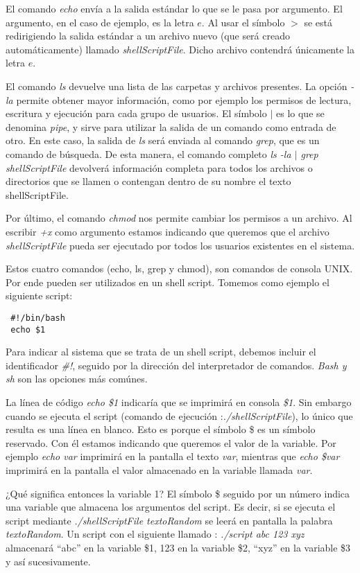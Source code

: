 El comando \textit{echo} envía a la salida estándar lo que se le pasa por argumento. El argumento, en el caso de ejemplo, es la letra $e$.
Al usar el símbolo $>$ se está redirigiendo la salida estándar a un archivo nuevo (que será creado automáticamente) llamado \textit{shellScriptFile}.
Dicho archivo contendrá únicamente la letra $e$.

El comando \textit{ls} devuelve una lista de las carpetas y archivos presentes. La opción \textit{-la} permite obtener mayor información, como por
ejemplo los permisos de lectura, escritura y ejecución para cada grupo de usuarios. El símbolo $|$ es lo que se denomina \textit{pipe}, y sirve
para utilizar la salida de un comando como entrada de otro. En este caso, la salida de \textit{ls} será enviada al comando \textit{grep}, que es un
comando de búsqueda. De esta manera, el comando completo \textit{ls -la $|$ grep shellScriptFile} devolverá información completa para todos los
archivos o directorios que se llamen o contengan dentro de su nombre el texto shellScriptFile.

Por último, el comando \textit{chmod} nos permite cambiar los permisos a un archivo. Al escribir \textit{+x} como argumento estamos indicando
que queremos que el archivo \textit{shellScriptFile} pueda ser ejecutado por todos los usuarios existentes en el sistema.

Estos cuatro comandos (echo, ls, grep y chmod), son comandos de consola UNIX. Por ende pueden ser utilizados en un shell script. Tomemos como
ejemplo el siguiente script:
\begin{lstlisting}
 #!/bin/bash
 echo $1
\end{lstlisting}

Para indicar al sistema que se trata de un shell script, debemos incluir el identificador \textit{\#!}, seguido por la dirección del interpretador
de comandos. \textit{Bash y sh} son las opciones más comúnes. 

La línea de código \textit{echo \$1} indicaría que se imprimirá en consola \textit{\$1}.
Sin embargo cuando se ejecuta el script (comando de ejecución :\textit{./shellScriptFile}), lo único que resulta es una línea en blanco. 
Esto es porque el símbolo \$ es
un símbolo reservado. Con él estamos indicando que queremos el valor de la variable. Por ejemplo \textit{echo var} imprimirá en la pantalla
el texto \textit{var}, mientras que \textit{echo \$var} imprimirá en la pantalla el valor almacenado en la variable llamada \textit{var}.

¿Qué significa entonces la variable 1? El símbolo \$ seguido por un número indica una variable que almacena los argumentos del script. Es decir, si
se ejecuta el script mediante \textit{./shellScriptFile textoRandom} se leerá en pantalla la palabra \textit{textoRandom}. Un script con el
siguiente llamado : \textit{./script abc 123 xyz} almacenará ``abc'' en la variable \$1, 123 en la variable \$2, ``xyz'' en la variable \$3 y
así sucesivamente.

